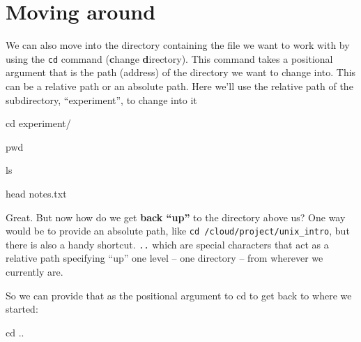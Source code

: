\documentclass[
]{book}
\newenvironment{Shaded}{\begin{snugshade}}{\end{snugshade}}
\newcommand{\BuiltInTok}[1]{#1}
\newcommand{\FunctionTok}[1]{\textcolor[rgb]{0.00,0.00,0.00}{#1}}
\newcommand{\NormalTok}[1]{#1}
\begin{document}
\hypertarget{moving-around}{%
\section{Moving around}\label{moving-around}}

We can also move into the directory containing the file we want to work with by using the \texttt{cd} command (\textbf{c}hange \textbf{d}irectory). This command takes a positional argument that is the path (address) of the directory we want to change into. This can be a relative path or an absolute path. Here we'll use the relative path of the subdirectory, ``experiment'', to change into it

\begin{Shaded}
\begin{Highlighting}[]
    \BuiltInTok{cd}\NormalTok{ experiment/}
\end{Highlighting}
\end{Shaded}

\begin{Shaded}
\begin{Highlighting}[]
    \BuiltInTok{pwd}
\end{Highlighting}
\end{Shaded}

\begin{Shaded}
\begin{Highlighting}[]
    \FunctionTok{ls}
\end{Highlighting}
\end{Shaded}

\begin{Shaded}
\begin{Highlighting}[]
    \FunctionTok{head}\NormalTok{ notes.txt}
\end{Highlighting}
\end{Shaded}

Great. But now how do we get \textbf{back ``up''} to the directory above us? One way would be to provide an absolute path, like \texttt{cd\ /cloud/project/unix\_intro}, but there is also a handy shortcut. \texttt{..} which are special characters that act as a relative path specifying ``up'' one level -- one directory -- from wherever we currently are.

So we can provide that as the positional argument to cd to get back to where we started:

\begin{Shaded}
\begin{Highlighting}[]
    \BuiltInTok{cd}\NormalTok{ ..}
\end{Highlighting}
\end{Shaded}
\end{document}
